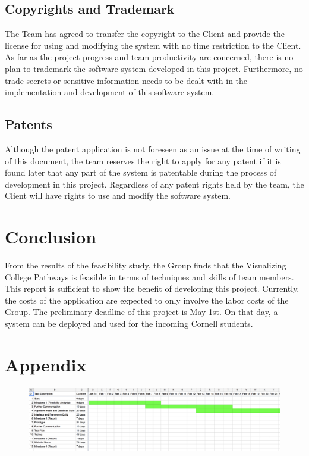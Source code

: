 \documentclass{article}
\begin{document}
\subsection{Copyrights and Trademark}
The Team has agreed to transfer the copyright to the Client and provide the license for using and modifying the system with no time restriction to the Client. As far as the project progress and team productivity are concerned, there is no plan to trademark the software system developed in this project. Furthermore, no trade secrets or sensitive information needs to be dealt with in the implementation and development of this software system.

\subsection{Patents}
Although the patent application is not foreseen as an issue at the time of writing of this document, the team reserves the right to apply for any patent if it is found later that any part of the system is patentable during the process of development in this project. Regardless of any patent rights held by the team, the Client will have rights to use and modify the software system.

\section{Conclusion}
From the results of the feasibility study, the Group finds that the Visualizing College Pathways is feasible in terms of techniques and skills of team members. This report is sufficient to show the benefit of developing this project. Currently, the costs of the application are expected to only involve the labor costs of the Group. The preliminary deadline of this project is May 1st. On that day, a system can be deployed and used for the incoming Cornell students.
\section{Appendix}
\begin{figure}[ht]
\includegraphics[scale=0.5,angle=270]{1.png}
\end{figure}
\end{document}
